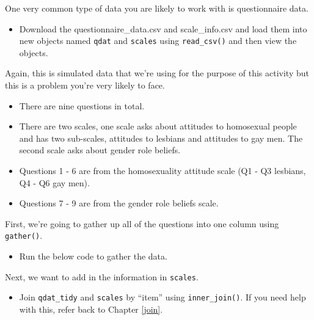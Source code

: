 \documentclass[]{book}
\newenvironment{Shaded}{\begin{snugshade}}{\end{snugshade}}
\newcommand{\DataTypeTok}[1]{\textcolor[rgb]{0.13,0.29,0.53}{#1}}
\newcommand{\KeywordTok}[1]{\textcolor[rgb]{0.13,0.29,0.53}{\textbf{#1}}}
\newcommand{\NormalTok}[1]{#1}
\newcommand{\OperatorTok}[1]{\textcolor[rgb]{0.81,0.36,0.00}{\textbf{#1}}}
\newcommand{\StringTok}[1]{\textcolor[rgb]{0.31,0.60,0.02}{#1}}
\providecommand{\tightlist}{%
  \setlength{\itemsep}{0pt}\setlength{\parskip}{0pt}}
\begin{document}
One very common type of data you are likely to work with is questionnaire data.

\begin{itemize}
\tightlist
\item
  Download the questionnaire\_data.csv and scale\_info.csv and load them into new objects named \texttt{qdat} and \texttt{scales} using \texttt{read\_csv()} and then view the objects.
\end{itemize}

Again, this is simulated data that we're using for the purpose of this activity but this is a problem you're very likely to face.

\begin{itemize}
\tightlist
\item
  There are nine questions in total.\\
\item
  There are two scales, one scale asks about attitudes to homosexual people and has two sub-scales, attitudes to lesbians and attitudes to gay men. The second scale asks about gender role beliefs.\\
\item
  Questions 1 - 6 are from the homosexuality attitude scale (Q1 - Q3 lesbians, Q4 - Q6 gay men).
\item
  Questions 7 - 9 are from the gender role beliefs scale.
\end{itemize}

First, we're going to gather up all of the questions into one column using \texttt{gather()}.

\begin{itemize}
\tightlist
\item
  Run the below code to gather the data.
\end{itemize}

\begin{Shaded}
\end{Shaded}

Next, we want to add in the information in \texttt{scales}.

\begin{itemize}
\tightlist
\item
  Join \texttt{qdat\_tidy} and \texttt{scales} by ``item'' using \texttt{inner\_join()}. If you need help with this, refer back to Chapter \ref{join}.
\end{itemize}
\end{document}
